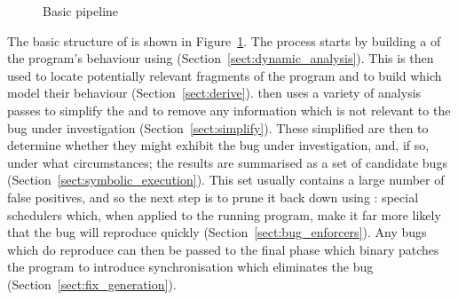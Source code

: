 \begin{figure}
\begin{center}
  \caption{Basic pipeline}
\end{center}
\label{fig:basic_pipeline}
\end{figure}

The basic structure of {\technique} is shown in
Figure~\ref{fig:basic_pipeline}.  The process starts by building a
 of the program's behaviour using  (Section~\ref{sect:dynamic_analysis}).  This
 is then used to locate potentially relevant fragments
of the program and to build {\StateMachines} which model their
behaviour (Section~\ref{sect:derive}).  {\Technique} then uses a
variety of analysis passes to simplify the {\StateMachines} and to
remove any information which is not relevant to the bug under
investigation (Section~\ref{sect:simplify}).  These simplified
{\StateMachines} are then  to determine
whether they might exhibit the bug under investigation, and, if so,
under what circumstances; the results are summarised as a set of
candidate bugs (Section~\ref{sect:symbolic_execution}).  This set
usually contains a large number of false positives, and so the next
step is to prune it back down using : special
schedulers which, when applied to the running program, make it far
more likely that the bug will reproduce quickly
(Section~\ref{sect:bug_enforcers}).  Any bugs which do reproduce can
then be passed to the final  phase which
binary patches the program to introduce synchronisation which
eliminates the bug (Section~\ref{sect:fix_generation}).


